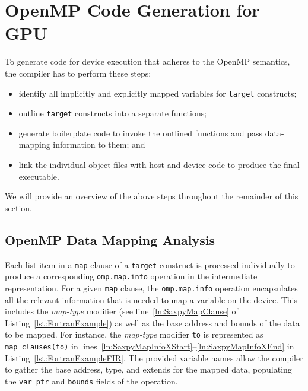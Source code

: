\documentclass[acmtog,natbib=false]{acmart}
\newcommand{\code}[1]{\texttt{#1}\xspace}
\begin{document}

\section{OpenMP Code Generation for GPU}
\label{sec:OpenMPCodeGen}

To generate code for device execution that adheres to the OpenMP semantics, the compiler has to perform these steps:

\begin{itemize}
\item identify all implicitly and explicitly mapped variables for \code{target} constructs;
\item outline \code{target} constructs into a separate functions;
\item generate boilerplate code to invoke the outlined functions and pass data-mapping information to them; and
\item link the individual object files with host and device code to produce the final executable.
\end{itemize}

We will provide an overview of the above steps throughout the remainder of this section.

\subsection{OpenMP Data Mapping Analysis}
\label{sec:OpenMPDataMappingAnalysis}

Each list item in a \code{map} clause of a \code{target} construct is processed individually to produce a corresponding \code{omp.map.info} operation in the intermediate representation. 
For a given \code{map} clause, the \code{omp.map.info} operation encapsulates all the relevant information that is needed to map a variable on the device.
This includes the \textit{map-type} modifier  (see line~\ref{ln:SaxpyMapClause} of Listing~\ref{lst:FortranExample}) as well as the base address and bounds of the data to be mapped.
For instance, the \textit{map-type} modifier \code{to} is represented as \code{map\_clauses(to)} in lines~\ref{ln:SaxpyMapInfoXStart}--\ref{ln:SaxpyMapInfoXEnd} in Listing~\ref{lst:FortranExampleFIR}.
The provided variable names allow the compiler to gather the base address, type, and extends for the mapped data, populating the \code{var\_ptr} and \code{bounds} fields of the operation. 
\end{document}

